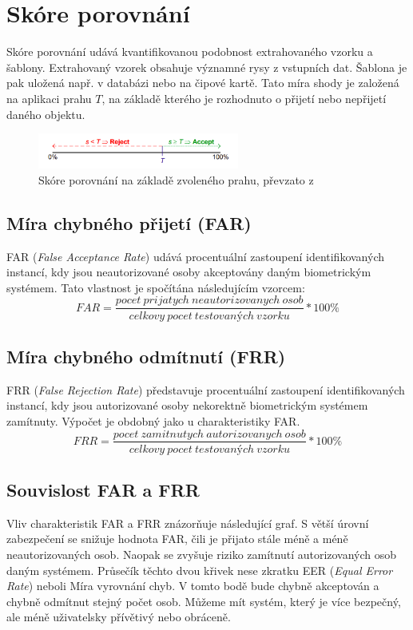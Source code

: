 \section{Skóre porovnání}
Skóre porovnání udává kvantifikovanou podobnost extrahovaného vzorku a šablony. Extrahovaný vzorek obsahuje významné rysy z vstupních dat. Šablona je pak uložená např. v databázi nebo na čipové kartě. Tato míra shody je založená na aplikaci prahu $T$, na základě kterého je rozhodnuto o přijetí nebo nepřijetí daného objektu. \cite{Drahansky}

\begin{figure}[!htbp]
    \centering
    \includegraphics[width=250px]{obrazky-figures/mira.png}
    \caption{Skóre porovnání na základě zvoleného prahu, převzato z \cite{Drahansky}}
\end{figure}

\subsection{Míra chybného přijetí (FAR)}
FAR (\textit{False Acceptance Rate}) udává procentuální zastoupení identifikovaných instancí, kdy jsou neautorizované osoby akceptovány daným biometrickým systémem. Tato vlastnost je spočítána následujícím vzorcem:
$$FAR = \frac{pocet\:prijatych\:neautorizovanych\:osob}{celkovy\:pocet\:testovaných\:vzorku} * 100 \%$$

\subsection{Míra chybného odmítnutí (FRR)}
FRR (\textit{False Rejection Rate}) představuje procentuální zastoupení identifikovaných instancí, kdy jsou autorizované osoby nekorektně biometrickým systémem zamítnuty. Výpočet je obdobný jako u charakteristiky FAR.
$$FRR = \frac{pocet\:zamitnutych\:autorizovanych\:osob}{celkovy\:pocet\:testovaných\:vzorku} * 100 \%$$

\subsection{Souvislost FAR a FRR}
Vliv charakteristik FAR a FRR znázorňuje následující graf. S větší úrovní zabezpečení se snižuje hodnota FAR, čili je přijato stále méně a méně neautorizovaných osob. Naopak se zvyšuje riziko zamítnutí autorizovaných osob daným systémem. Průsečík těchto dvou křivek nese zkratku EER (\textit{Equal Error Rate}) neboli Míra vyrovnání chyb. V tomto bodě bude chybně akceptován a chybně odmítnut stejný počet osob. Můžeme mít systém, který je více bezpečný, ale méně uživatelsky přívětivý nebo obráceně. \cite{FARFRR}

